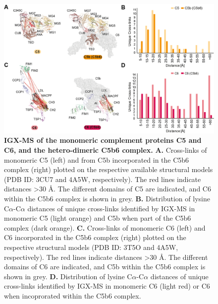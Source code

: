\begin{figure}[b!]
	\center
	\includegraphics[]{Chapter.2/Figures/Figure5.png}
	\caption{\textbf{IGX-MS of the monomeric complement proteins C5 and C6, and the hetero-dimeric C5b6 complex.} \textbf{A.} Cross-links of monomeric C5 (left) and from C5b incorporated in the C5b6 complex (right) plotted on the respective available structural models (PDB ID: 3CU7 and 4A5W, respectively). The red lines indicate distances >30 Å. The different domains of C5 are indicated, and C6 within the C5b6 complex is shown in grey. \textbf{B.} Distribution of lysine C$\alpha$-C$\alpha$ distances of unique cross-links identified by IGX-MS in monomeric C5 (light orange) and C5b when part of the C5b6 complex (dark orange). \textbf{C.} Cross-links of monomeric C6 (left) and C6 incorporated in the C5b6 complex (right) plotted on the respective structural models (PDB ID: 3T5O and 4A5W, respectively). The red lines indicate distances >30 Å. The different domains of C6 are indicated, and C5b within the C5b6 complex is shown in grey. \textbf{D.} Distribution of lysine C$\alpha$-C$\alpha$ distances of unique cross-links identified by IGX-MS in monomeric C6 (light red) or C6 when incoprorated within the C5b6 complex.}
	\label{fig:ch2_fig5}
\end{figure}
